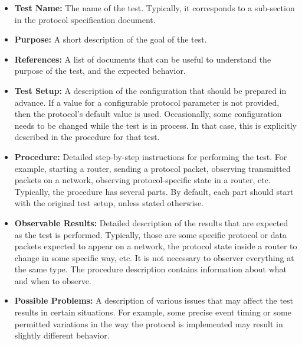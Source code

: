 \documentclass[11pt]{report}
\begin{document}
\begin{itemize}

  \item {\bf Test Name:} The name of the test. Typically, it corresponds to a
  sub-section in the protocol specification document.

  \item {\bf Purpose:} A short description of the goal of the test.

  \item {\bf References:} A list of documents that can be useful to understand
  the purpose of the test, and the expected behavior.

  \item {\bf Test Setup:} A description of the configuration that should be
  prepared in advance. If a value for a configurable protocol parameter is not
  provided, then the protocol's default value is used.
  Occasionally, some configuration needs to be changed
  while the test is in process. In that case, this is explicitly described in
  the procedure for that test. 

  \item {\bf Procedure:} Detailed step-by-step instructions for performing the
  test. For example, starting a router, sending a protocol packet, observing
  transmitted packets on a network, observing protocol-specific state
  in a router, etc. Typically, the procedure has several parts. By default,
  each part should start with the original test setup, unless stated
  otherwise.

  \item {\bf Observable Results:} Detailed description of the results that are
  expected as the test is performed. Typically, those are some specific
  protocol or data packets expected to appear on a network, the protocol state
  inside a router to change in some specific way, etc. It is not necessary to
  observer everything at the same type. The procedure description contains
  information about what and when to observe.

  \item {\bf Possible Problems:} A description of various issues that may
  affect the test results in certain situations. For example, some precise
  event timing or some permitted variations in the way the protocol is
  implemented may result in slightly different behavior.

\end{itemize}

\end{document}

